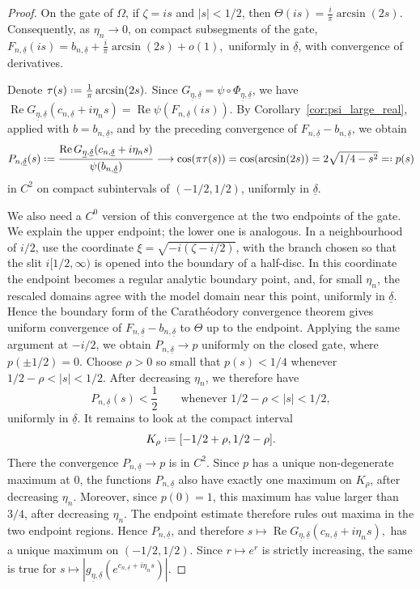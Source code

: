 \documentclass[10pt,a4paper]{amsart}
\newcommand{\Rea}{\operatorname{Re }}
\newcommand*{\defeq}{\mathrel{\vcenter{\baselineskip0.5ex \lineskiplimit0pt
 \hbox{\scriptsize.}\hbox{\scriptsize.}}}=}
\newcommand{\eqdef}{=\mathrel{\vcenter{\baselineskip0.5ex \lineskiplimit0pt
	\hbox{\scriptsize.}\hbox{\scriptsize.}}}}
\newcommand{\uldelta}{\underline{\delta}}
\newcommand{\uleta}{\underline{\eta}}
\begin{document}
\begin{proof}
	On the gate of \(\Omega\), if \(\zeta=is\) and \(|s|<1/2\), then
	$
	\Theta(is)
	=
	\frac{i}{\pi}\arcsin(2s).
	$
	Consequently, as \(\eta_n\to0\), on compact subsegments of the gate,
	$
	F_{n,\uldelta}(is)
	=
	b_{n,\uldelta}
	+
	\frac{i}{\pi}\arcsin(2s)
	+ o(1),
	$
	uniformly in \(\uldelta\), with convergence of derivatives.
	
	Denote
	$
	\tau(s)\defeq \frac1\pi\arcsin(2s).
	$
	Since \(G_{\uleta,\uldelta}=\psi\circ\Phi_{\uleta,\uldelta}\), we have
	$
	\Rea G_{\uleta,\uldelta}(c_{n,\uldelta}+i\eta_ns)
	=
	\Rea \psi(F_{n,\uldelta}(is)).
	$
	By Corollary~\ref{cor:psi_large_real}, applied with
	\(b=b_{n,\uldelta}\), and by the preceding convergence of
	\(F_{n,\uldelta}-b_{n,\uldelta}\), we obtain
	\[
	P_{n,\uldelta}(s)
	\defeq
	\frac{
		\Rea G_{\uleta,\uldelta}(c_{n,\uldelta}+i\eta_ns)
	}{
		\psi(b_{n,\uldelta})
	}
	\longrightarrow
	\cos(\pi\tau(s))=
	\cos(\arcsin(2s))
	=
	2\sqrt{1/4-s^2}\eqdef	p(s)
	\]
	in \(C^2\) on compact subintervals of \((-1/2,1/2)\), uniformly in
	\(\uldelta\).

We also need a \(C^0\) version of this convergence at the two endpoints of
		the gate. 	We explain the upper endpoint; the lower one is analogous. In a
		neighbourhood of \(i/2\), use the coordinate
		\(\xi=\sqrt{-i(\zeta-i/2)}\), with the branch chosen so that the slit
		\(i[1/2,\infty)\) is opened into the boundary of a half-disc. In this
		coordinate the endpoint becomes a regular analytic boundary point, and, for
		small \(\eta_n\), the rescaled domains agree with the model domain near this
		point, uniformly in \(\uldelta\). Hence the boundary form of the
		Carath\'eodory convergence theorem gives uniform convergence of
		\(F_{n,\uldelta}-b_{n,\uldelta}\) to \(\Theta\) up to the endpoint. Applying
		the same argument at \(-i/2\), we obtain \(P_{n,\uldelta}\to p\) uniformly on
		the closed gate, where \(p(\pm1/2)=0\). Choose \(\rho>0\) so small that
	\(p(s)<1/4\) whenever \(1/2-\rho<|s|<1/2\). After decreasing \(\eta_n\),
	we therefore have
	\[
	P_{n,\uldelta}(s)<\frac12
	\qquad
	\text{whenever }1/2-\rho<|s|<1/2,
	\]
	uniformly in \(\uldelta\). It remains to look at the compact interval
	\[
	K_\rho\defeq[-1/2+\rho,1/2-\rho].
	\]
	There the convergence \(P_{n,\uldelta}\to p\) is in \(C^2\). Since \(p\) has
	a unique non-degenerate maximum at \(0\), the functions
	\(P_{n,\uldelta}\) also have exactly one maximum on \(K_\rho\), after
	decreasing \(\eta_n\). Moreover, since \(p(0)=1\), this maximum has value
	larger than \(3/4\), after decreasing \(\eta_n\). The endpoint estimate
	therefore rules out maxima in the two endpoint regions. Hence
	\(P_{n,\uldelta}\), and therefore
	$
	s\mapsto
	\Rea G_{\uleta,\uldelta}(c_{n,\uldelta}+i\eta_ns),
	$
	has a unique maximum on \((-1/2,1/2)\). Since \(r\mapsto e^r\) is strictly
	increasing, the same is true for
	$
	s\mapsto
	|g_{\uleta,\uldelta}(e^{c_{n,\uldelta}+i\eta_ns})|.
	$
	

\end{proof}
\end{document}
